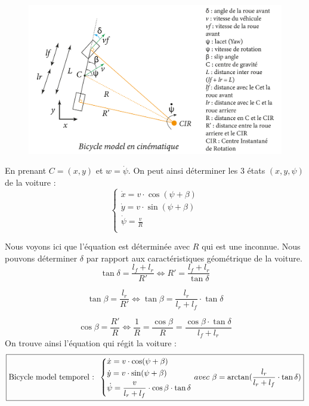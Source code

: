 \documentclass[a4paper,12pt]{extarticle}
\begin{document}
\begin{figure}[h!]
    \centering
    \includegraphics[width=1\textwidth]{image/bicycle_Model_cinematic.png}\\
\end{figure}

En prenant $C =(x,y)$ et $w=\dot{\psi}$. On peut ainsi déterminer les 3 états $(x,y,\psi)$ de la voiture : 
\begin{equation*}
    \begin{cases}
        \dot{x} = v\cdot\cos(\psi + \beta) \\
        \dot{y} = v\cdot\sin(\psi + \beta) \\
        \dot{\psi} = \frac{v}{R} \\
    \end{cases}
\end{equation*}

Nous voyons ici que l'équation est déterminée avec $R$ qui est une inconnue.
Nous pouvons déterminer $\delta$ par rapport aux caractéristiques géométrique de la voiture.
\begin{equation*}
    \tan\delta = \frac{l_f+l_r}{R'} 
    \Leftrightarrow  R'= \frac{l_f+l_r}{\tan\delta}
\end{equation*}

\begin{equation*}
    \tan\beta = \frac{l_r}{R'}
    \Leftrightarrow \tan\beta = \frac{l_r}{l_r+l_f}\cdot\tan\delta
\end{equation*}    

\begin{equation*}
    \cos\beta = \frac{R'}{R} \Leftrightarrow \frac{1}{R} = \frac{\cos\beta}{R} = \frac{\cos\beta \cdot \tan\delta}{l_f+l_r}
\end{equation*}
On trouve ainsi l'équation qui régit la voiture : 
\begin{equation}
\boxed{
\text{Bicycle model temporel : }
     \left .
   \begin{dcases}
        \dot{x} = v\cdot\cos(\psi + \beta) \\
        \dot{y} = v\cdot\sin(\psi + \beta) \\
        \dot{\psi} = \frac{v}{l_r+l_f}\cdot\cos\beta\cdot\tan\delta \\
   \end{dcases}
   \right .
   avec \ \beta = \arctan(\frac{l_r}{l_r+l_f} \cdot \tan\delta) 
}
\end{equation}
\end{document}
